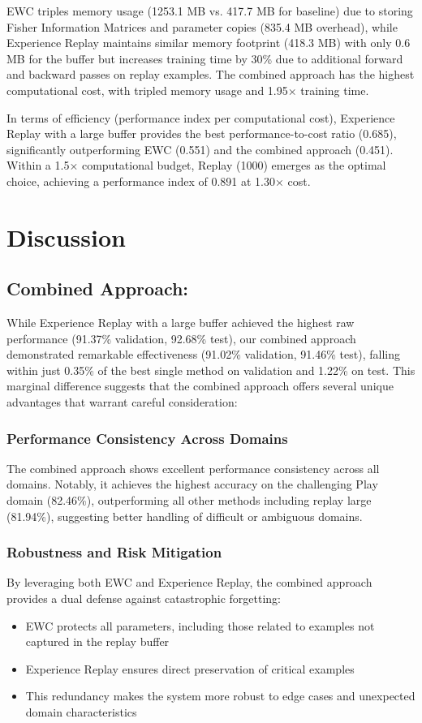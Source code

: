 \documentclass[conference]{IEEEtran}
\begin{document}
EWC triples memory usage (1253.1 MB vs. 417.7 MB for baseline) due to storing Fisher Information Matrices and parameter copies (835.4 MB overhead), while Experience Replay maintains similar memory footprint (418.3 MB) with only 0.6 MB for the buffer but increases training time by 30\% due to additional forward and backward passes on replay examples. The combined approach has the highest computational cost, with tripled memory usage and 1.95× training time.

In terms of efficiency (performance index per computational cost), Experience Replay with a large buffer provides the best performance-to-cost ratio (0.685), significantly outperforming EWC (0.551) and the combined approach (0.451). Within a 1.5× computational budget, Replay (1000) emerges as the optimal choice, achieving a performance index of 0.891 at 1.30× cost.

\section{Discussion}

\subsection{Combined Approach:}

While Experience Replay with a large buffer achieved the highest raw performance (91.37\% validation, 92.68\% test), our combined approach demonstrated remarkable effectiveness (91.02\% validation, 91.46\% test), falling within just 0.35\% of the best single method on validation and 1.22\% on test. This marginal difference suggests that the combined approach offers several unique advantages that warrant careful consideration:

\subsubsection{Performance Consistency Across Domains}
The combined approach shows excellent performance consistency across all domains. Notably, it achieves the highest accuracy on the challenging Play domain (82.46\%), outperforming all other methods including replay large (81.94\%), suggesting better handling of difficult or ambiguous domains.

\subsubsection{Robustness and Risk Mitigation}
By leveraging both EWC and Experience Replay, the combined approach provides a dual defense against catastrophic forgetting:
\begin{itemize}
    \item EWC protects all parameters, including those related to examples not captured in the replay buffer
    \item Experience Replay ensures direct preservation of critical examples
    \item This redundancy makes the system more robust to edge cases and unexpected domain characteristics
\end{itemize}
\end{document}
